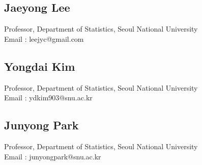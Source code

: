 \vspace*{10pt}
\subsection {{Jaeyong Lee}}
Professor, Department of Statistics, Seoul National University \\
\vspace*{2pt}
Email : leejyc@gmail.com

\vspace*{6pt}
\subsection{{Yongdai Kim}}
Professor, Department of Statistics, Seoul National University \\
\vspace*{2pt}
Email : ydkim903@snu.ac.kr

\vspace*{6pt}
\subsection{{Junyong Park}}
Professor, Department of Statistics, Seoul National University \\
\vspace*{2pt}
Email : junyongpark@snu.ac.kr